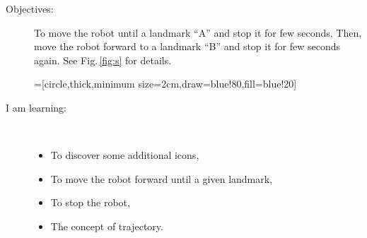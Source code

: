 \begin{flushleft}
\begin{description}
\item[Objectives:] To move the robot until a landmark ``A'' and stop it for few seconds. Then, move the robot forward to a landmark ``B'' and stop it for few seconds again. See Fig.\,\ref{fig:s} for details.
\begin{minipage}[c]{\textwidth}
\centering
{}=[circle,thick,minimum size=2cm,draw=blue!80,fill=blue!20]
\vspace{1ex}
\label{fig:s}
\end{minipage}
\item[I am learning:] \hfill \\ \vspace{-1ex}
  \begin{itemize}
  \item To discover some additional icons,
  \item To move the robot forward until a given landmark,
  \item To stop the robot,
  \item The concept of trajectory.
  \end{itemize}
\end{description}
\end{flushleft}
\frameboxend

